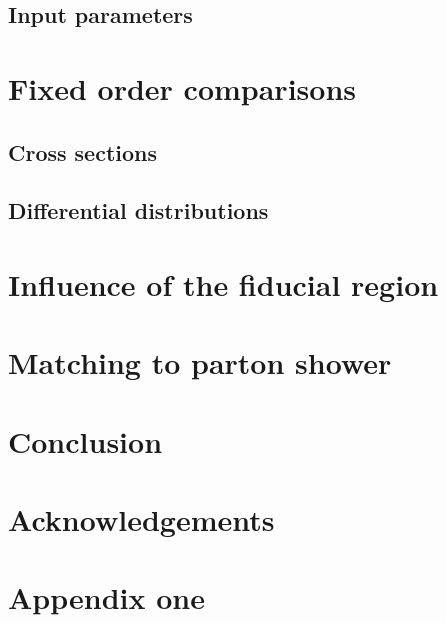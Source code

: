 \documentclass[11pt,epsf]{article}
\begin{document}
\subsection{Input parameters}



\section{Fixed order comparisons}

\subsection{Cross sections}



\subsection{Differential distributions}



\section{Influence of the fiducial region}

\section{Matching to parton shower}



\section{Conclusion}



\section*{Acknowledgements}



\appendix

\section{Appendix one}




\end{document}
